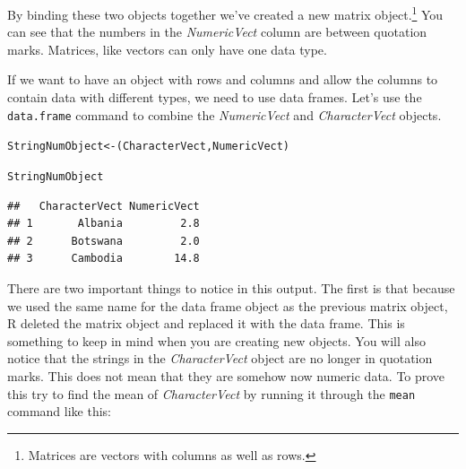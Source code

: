 \noindent By binding these two objects together we've created a new matrix object.\footnote{Matrices are vectors with columns as well as rows.} You can see that the numbers in the {\emph{NumericVect}} column are between quotation marks. Matrices, like vectors can only have one data type. \\[0.25cm]

 \cite[]{Matloff2011}

If we want to have an object with rows and columns and allow the columns to contain data with different types, we need to use data frames. Let's use the \texttt{data.frame} command to combine the {\emph{NumericVect}} and {\emph{CharacterVect}} objects.

\begin{knitrout}
\color{fgcolor}\begin{kframe}
\begin{alltt}
StringNumObject <- (CharacterVect, NumericVect)

StringNumObject
\end{alltt}
\begin{verbatim}
##   CharacterVect NumericVect
## 1       Albania         2.8
## 2      Botswana         2.0
## 3      Cambodia        14.8
\end{verbatim}
\end{kframe}
\end{knitrout}


\noindent There are two important things to notice in this output. The first is that because we used the same name for the data frame object as the previous matrix object, R deleted the matrix object and replaced it with the data frame. This is something to keep in mind when you are creating new objects. You will also notice that the strings in the {\emph{CharacterVect}} object are no longer in quotation marks. This does not mean that they are somehow now numeric data. To prove this try to find the mean of {\emph{CharacterVect}} by running it through the \texttt{mean} command like this:

\begin{knitrout}
\color{fgcolor}
\end{knitrout}


